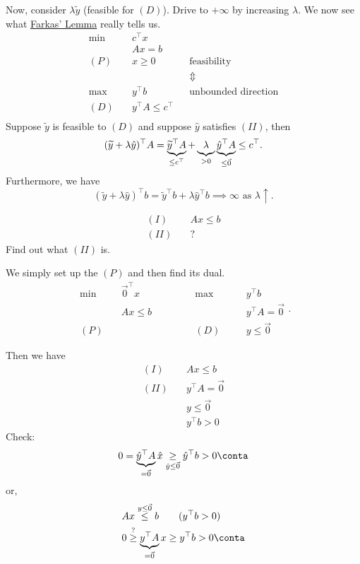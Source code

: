 \begin{remark}
	Now, consider \(\lambda \widetilde{y}\) (feasible for \((D)\)). Drive to \(+\infty \) by increasing \(\lambda\). We now see what \hyperref[lma:Farkas-lemma]{Farkas' Lemma}
	really tells us.
	\begin{align*}
		\min~    & c^{\top} x                                               \\
		         & Ax = b                                                   \\
		(P)\quad & x\geq 0                  &  & \text{feasibility}         \\
		         &                          &  & \Updownarrow               \\
		\max~    & y^{\top}b                &  & \text{unbounded direction} \\
		(D)\quad & y^{\top} A \leq c^{\top}                                 \\
	\end{align*}
	Suppose \(\widetilde{y}\) is feasible to \((D)\) and suppose \(\hat{y}\) satisfies \((II)\), then
	\[
		(\widetilde{y}+\lambda \hat{y})^{\top} A = \underbrace{\widetilde{y}^{\top}A}_{\leq c^{\top}} + \underbrace{\vphantom{y}\lambda}_{>0} \underbrace{\hat{y}^{\top} A}_{\leq \vec{0}} \leq c^{\top}.
	\]
	Furthermore, we have
	\[
		(\widetilde{y}+\lambda \hat{y})^{\top} b = \widetilde{y}^{\top} b+\lambda \hat{y}^{\top} b \implies \infty \text{ as } \lambda \uparrow  .
	\]
\end{remark}

\begin{eg}
	\begin{align*}
		(I)\quad  & Ax\leq b \\
		(II)\quad & ?
	\end{align*}
	Find out what \((II)\) is.
\end{eg}
\begin{explanation}
	We simply set up the \((P)\) and then find its dual.
	\[
		\begin{alignedat}{5}
			\min~&\vec{0}^{\top} x\qquad\qquad	&&\max ~&&y^{\top}b\\
			&Ax \leq b 			&&			&&y^{\top} A =\vec{0}\\
			(P)\quad&			&&(D)\quad	&&y\leq \vec{0}
		\end{alignedat}.
	\]

	Then we have
	\begin{align*}
		(I)\quad  & Ax\leq b            \\
		(II)\quad & y^{\top}A = \vec{0} \\
		          & y\leq \vec{0}       \\
		          & y^{\top} b>0
	\end{align*}
	Check\(\colon\)
	\[
		0 = \underbrace{\hat{y}^{\top} A}_{=\vec{0}} \hat{x} \underset{\hat{y} \leq \vec{0}}{\geq}  \hat{y}^{\top} b>0 \conta
	\]
	or,
	\[
		\begin{split}
			&Ax \overset{y\leq \vec{0}}{\leq} b\qquad (y^{\top}b>0)\\
			&0 \overset{?}{\geq} \underbrace{y^{\top}A}_{ = \vec{0}} x\geq y^{\top}b>0\conta
		\end{split}
	\]
\end{explanation}


